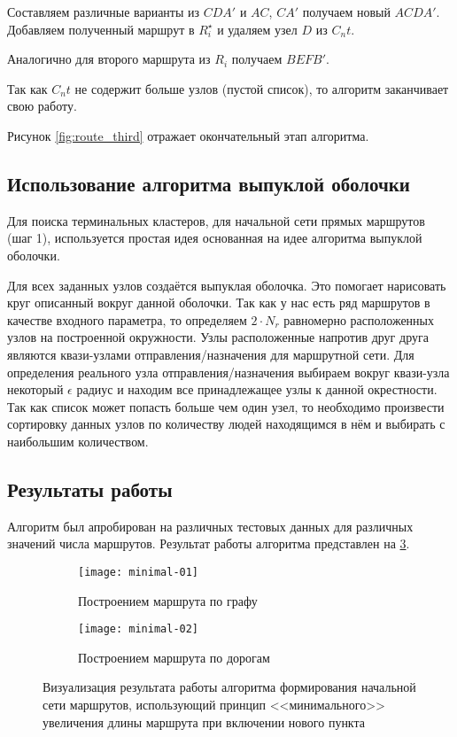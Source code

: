 Составляем различные варианты из \( CDA' \) и \( AC \), \( CA' \) получаем новый \( ACDA' \). Добавляем 
полученный маршрут в \( R^{\star}_i \) и удаляем узел \( D \) из \( C_nt \).

Аналогично для второго маршрута из \( R_i \) получаем \( BEFB' \).

Так как \( C_nt \) не содержит больше узлов (пустой список), то алгоритм заканчивает свою работу.

Рисунок \ref{fig:route_third} отражает окончательный этап алгоритма.

\subsection{Использование алгоритма выпуклой оболочки}
Для поиска терминальных кластеров, для начальной сети прямых маршрутов (шаг 1), используется простая идея 
основанная на идее алгоритма выпуклой оболочки.

Для всех заданных узлов создаётся выпуклая оболочка. Это помогает нарисовать круг описанный вокруг данной
оболочки. Так как у нас есть ряд маршрутов в качестве входного параметра, то определяем \( 2\cdot N_r \) 
равномерно расположенных узлов на построенной окружности. Узлы расположенные напротив друг друга являются 
квази-узлами отправления/назначения для маршрутной сети. Для определения реального узла отправления/назначения 
выбираем вокруг квази-узла некоторый \( \epsilon \) радиус и находим все принадлежащее узлы к данной окрестности.
Так как список может попасть больше чем один узел, то необходимо произвести сортировку данных узлов по 
количеству людей находящимся в нём и выбирать с наибольшим количеством.

\subsection{Результаты работы}
Алгоритм был апробирован на различных тестовых данных для различных значений числа маршрутов. 
Результат работы алгоритма представлен на \ref{img:min-length-01}.
\begin{figure}[h!]
    \centering
    \begin{subfigure}{0.75\textwidth}
        \texttt{[image: minimal-01]}
        \caption{Построением маршрута по графу}
        \label{fig:graph}
    \end{subfigure}
    \begin{subfigure}{0.75\textwidth}
        \texttt{[image: minimal-02]}
        \caption{Построением маршрута по дорогам}
        \label{fig:osrm}
    \end{subfigure}
    \caption{Визуализация результата работы алгоритма формирования начальной сети маршрутов, 
        использующий принцип <<минимального>> увеличения длины маршрута при включении нового пункта%
    }
   \label{img:min-length-01}
\end{figure}

